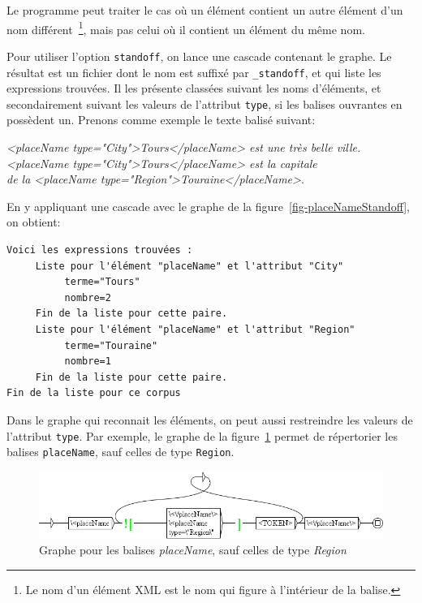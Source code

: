 \noindent Le programme peut traiter le cas où un élément contient un autre élément d'un nom
différent~\footnote{Le nom d'un élément XML est le nom qui figure à l'intérieur de la balise.}, mais
pas celui où il contient un élément du même nom. 

\bigskip
\noindent Pour utiliser l'option \verb$standoff$, on lance une cascade contenant le graphe. Le résultat
est un fichier dont le nom est suffixé par \verb$_standoff$, et
qui liste les expressions trouvées. Il les présente classées suivant les noms d'éléments,
et secondairement suivant les valeurs de l'attribut \verb$type$, si les balises ouvrantes en possèdent
un. Prenons comme exemple le texte balisé suivant:

\bigskip
\noindent \emph{<placeName type="City">Tours</placeName> est une très belle ville. \\
<placeName type="City">Tours</placeName> est la capitale \\
de la <placeName type="Region">Touraine</placeName>}.

\bigskip
\noindent En y appliquant une cascade avec le graphe de la figure~\ref{fig-placeNameStandoff},
on obtient:
\begin{verbatim}
Voici les expressions trouvées :
     Liste pour l'élément "placeName" et l'attribut "City" 
          terme="Tours" 
          nombre=2 
     Fin de la liste pour cette paire.
     Liste pour l'élément "placeName" et l'attribut "Region" 
          terme="Touraine" 
          nombre=1 
     Fin de la liste pour cette paire.
Fin de la liste pour ce corpus
\end{verbatim}

\noindent Dans le graphe qui reconnait les éléments, on peut aussi restreindre les valeurs de
l'attribut \verb$type$. Par exemple, le graphe de la figure~\ref{fig-placeNameHorsRegionStandoff}
permet de répertorier les balises \verb$placeName$, sauf celles de type \verb$Region$.

\begin{figure}[!htb]
  \centering
  \includegraphics[width=15cm]{resources/img/placeNameHorsRegionStandoff.png}
  \caption{Graphe pour les balises \emph{placeName}, sauf celles de type \emph{Region}}
  \label{fig-placeNameHorsRegionStandoff}
\end{figure}

